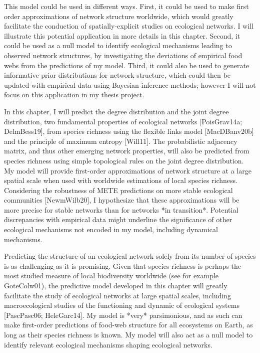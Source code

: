 This model could be used in different ways. First, it could be used to make
first order approximations of network structure worldwide, which would greatly
facilitate the conduction of spatially-explicit studies on ecological networks.
I will illustrate this potential application in more details in this chapter.
Second, it could be used as a null model to identify ecological mechanisms
leading to observed network structures, by investigating the deviations of
empirical food webs from the predictions of my model. Third, it could also be
used to generate informative prior distributions for network structure, which
could then be updated with empirical data using Bayesian inference methods;
however I will not focus on this application in my thesis project.

In this chapter, I will predict the degree distribution and the joint degree
distribution, two fundamental properties of ecological networks [PoisGrav14a;
DelmBess19], from species richness using the flexible links model
[MacDBanv20b] and the principle of maximum entropy [Will11]. The probabilistic
adjacency matrix, and thus other emerging network properties, will also be
predicted from species richness using simple topological rules on the joint
degree distribution. My model will provide first-order approximations of network
structure at a large spatial scale when used with worldwide estimations of local
species richness. Considering the robustness of METE predictions on more stable
ecological communities [NewmWilb20], I hypothesize that these approximations
will be more precise for stable networks than for networks *in transition*.
Potential discrepancies with empirical data might underline the significance of
other ecological mechanisms not encoded in my model, including dynamical
mechanisms.

Predicting the structure of an ecological network solely from its number of
species is as challenging as it is promising. Given that species richness is
perhaps the most studied measure of local biodiversity worldwide (see for
example GoteColw01), the predictive model developed in this chapter will
greatly facilitate the study of ecological networks at large spatial scales,
including macroecological studies of the functioning and dynamic of ecological
systems [PascPasc06; HeleGarc14]. My model is *very* parsimonious, and as such
can make first-order predictions of food-web structure for all ecosystems on
Earth, as long as their species richness is known. My model will also act as a
null model to identify relevant ecological mechanisms shaping ecological
networks.

